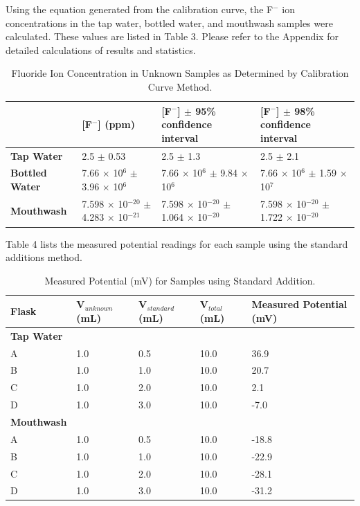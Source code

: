 \documentclass[journal=jacsat,manuscript=article,layout=twocolumn]{achemso}
\begin{document}
Using the equation generated from the calibration curve, the F$^-$ ion
concentrations in the tap water, bottled water, and mouthwash samples were
calculated. These values are listed in Table 3. Please refer to the Appendix for
detailed calculations of results and statistics.

\begin{table}[t]
    \caption{Fluoride Ion Concentration in Unknown Samples as Determined by
    Calibration Curve Method.}
    \begin{tabular}{L|L|L|L}
        \hline
        & [F$^-$] (ppm) & [F$^-$] $\pm$ 95\% confidence interval & [F$^-$] $\pm$ 98\% confidence interval \\
        \hline
        \textbf{Tap Water}& 2.5 $\pm$ 0.53 & 2.5 $\pm$ 1.3 & 2.5 $\pm$ 2.1 \\
        \hline
        \textbf{Bottled Water} & 7.66 $\times$ 10$^6$ \hspace{2cm} $\pm$ 3.96 $\times$ 10$^6$ & 
        7.66 $\times$ 10$^6$ \hspace{2cm} $\pm$ 9.84 $\times$ 10$^6$ & 
        7.66 $\times$ 10$^6$ \hspace{2cm} $\pm$ 1.59 $\times$ 10$^7$ \\
        \hline
        \textbf{Mouthwash} & 7.598 $\times$ 10$^{-20}$ \hspace{2cm} $\pm$ 4.283 $\times$ 10$^{-21}$ & 
        7.598 $\times$ 10$^{-20}$ \hspace{2cm} $\pm$ 1.064 $\times$ 10$^{-20}$ & 
        7.598 $\times$ 10$^{-20}$ \hspace{2cm} $\pm$ 1.722 $\times$ 10$^{-20}$ \\
        \hline
    \end{tabular}
\end{table}

Table 4 lists the measured potential readings for each sample using the standard
additions method.
\begin{table}[t]
    \caption{Measured Potential (mV) for Samples using Standard
    Addition.}
    \begin{tabular}{L|L|L|L|L}
        \hline
        Flask & V$_{unknown}$ (mL) & V$_{standard}$ (mL) & V$_{total}$ (mL) & Measured Potential (mV) \\
        \hline
        \textbf{Tap Water} & & & & \\
        A & 1.0 & 0.5 & 10.0 & 36.9 \\
        B & 1.0 & 1.0 & 10.0 & 20.7 \\
        C & 1.0 & 2.0 & 10.0 & 2.1 \\
        D & 1.0 & 3.0 & 10.0 & -7.0 \\
        \hline
        \textbf{Mouthwash} & & & & \\
        A & 1.0 & 0.5 & 10.0 & -18.8 \\
        B & 1.0 & 1.0 & 10.0 & -22.9 \\
        C & 1.0 & 2.0 & 10.0 & -28.1 \\
        D & 1.0 & 3.0 & 10.0 & -31.2 \\
        \hline
    \end{tabular}
\end{table}
\end{document}
